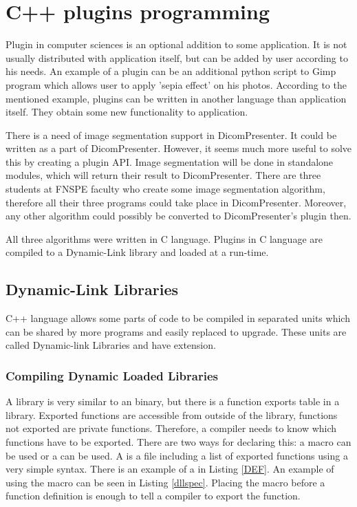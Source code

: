 \chapter*{C++ plugins programming}

Plugin in computer sciences is an optional addition to some application. It is not usually distributed with application itself, but can be added by user according to his needs. An example of a plugin can be an additional python script to Gimp program which allows user to apply 'sepia effect' on his photos. According to the mentioned example, plugins can be written in another language than application itself. They obtain some new functionality to application.

There is a need of image segmentation support in DicomPresenter. It could be written as a part of DicomPresenter. However, it seems much more useful to solve this by creating a plugin API. Image segmentation will be done in standalone modules, which will return their result to DicomPresenter. There are three students at FNSPE faculty who create some image segmentation algorithm, therefore all their three programs could take place in DicomPresenter. Moreover, any other algorithm could possibly be converted to DicomPresenter's plugin then.

All three algorithms were written in C language. Plugins in C language are compiled to a Dynamic-Link library and loaded at a run-time.

\section*{Dynamic-Link Libraries}

C++ language allows some parts of code to be compiled in separated units which can be shared by more programs and easily replaced to upgrade. These units are called Dynamic-link Libraries and have  extension.

\subsection*{Compiling Dynamic Loaded Libraries}

A  library is very similar to an  binary, but there is a function exports table in a  library. Exported functions are accessible from outside of the library, functions not exported are private functions. Therefore, a compiler needs to know which functions have to be exported. There are two ways for declaring this: a  macro can be used or a  can be used. A  is a file including a list of exported functions using a very simple syntax. There is an example of a  in Listing \ref{DEF}. An example of using the  macro can be seen in Listing \ref{dllspec}. Placing the macro before a function definition is enough to tell a compiler to export the function.


